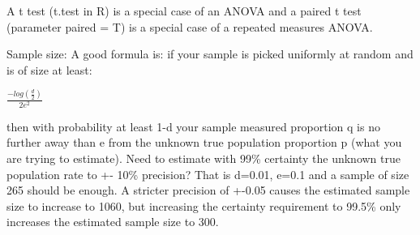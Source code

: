 \documentclass[]{book}
\theoremstyle{definition}
\theoremstyle{definition}
\theoremstyle{definition}
\theoremstyle{remark}
\begin{document}
A t test (t.test in R) is a special case of an ANOVA and a paired t test
(parameter paired = T) is a special case of a repeated measures ANOVA.

Sample size: A good formula is: if your sample is picked uniformly at
random and is of size at least:

\(\frac{-log(\frac{d}{2})}{2e^2}\)

then with probability at least 1-d your sample measured proportion q is
no further away than e from the unknown true population proportion p
(what you are trying to estimate). Need to estimate with 99\% certainty
the unknown true population rate to +- 10\% precision? That is d=0.01,
e=0.1 and a sample of size 265 should be enough. A stricter precision of
+-0.05 causes the estimated sample size to increase to 1060, but
increasing the certainty requirement to 99.5\% only increases the
estimated sample size to 300.
\end{document}

